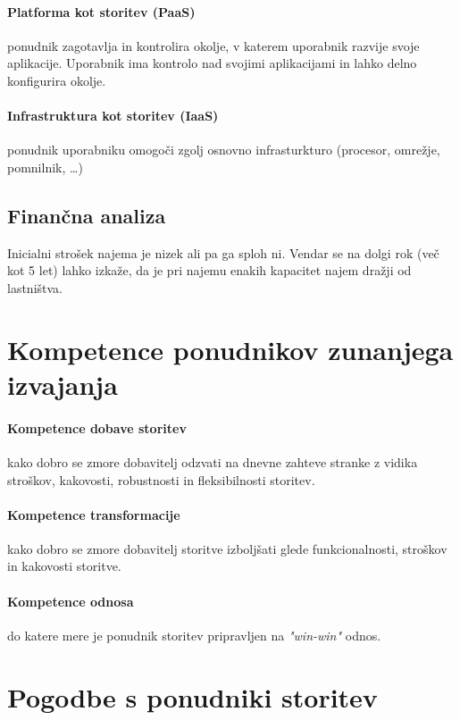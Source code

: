 \documentclass[a4paper,12pt]{report}
\begin{document}
            \paragraph{Platforma kot storitev (PaaS)} ponudnik zagotavlja in kontrolira okolje, v katerem uporabnik razvije svoje aplikacije. Uporabnik ima kontrolo nad svojimi aplikacijami in lahko delno konfigurira okolje.

            \paragraph{Infrastruktura kot storitev (IaaS)} ponudnik uporabniku omogoči zgolj osnovno infrasturkturo (procesor, omrežje, pomnilnik, \dots)

         \subsection{Finančna analiza}
            Inicialni strošek najema je nizek ali pa ga sploh ni. Vendar se na dolgi rok (več kot 5 let) lahko izkaže, da je pri najemu enakih kapacitet najem dražji od lastništva.

      \section{Kompetence ponudnikov zunanjega izvajanja}
         \paragraph{Kompetence dobave storitev} kako dobro se zmore dobavitelj odzvati na dnevne zahteve stranke z vidika stroškov, kakovosti, robustnosti in fleksibilnosti storitev.

         \paragraph{Kompetence transformacije} kako dobro se zmore dobavitelj storitve izboljšati glede funkcionalnosti, stroškov in kakovosti storitve.

         \paragraph{Kompetence odnosa} do katere mere je ponudnik storitev pripravljen na \emph{"win-win"} odnos.
      
      \section{Pogodbe s ponudniki storitev}
\end{document}

